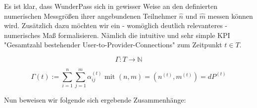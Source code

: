 \vspace{0.3cm}

Es ist klar, dass WunderPass sich in gewisser Weise an den definierten numerischen Messgrößen ihrer angebundenen Teilnehmer $\widehat{n}$ und $\widehat{m}$ messen können wird. Zusätzlich dazu möchten wir ein - womöglich deutlich relevanteres - numerisches Maß formalisieren. Nämlich die intuitive und sehr simple KPI "Gesamtzahl bestehender User-to-Provider-Connections" zum Zeitpunkt $t \in T$.

\vspace{0.3cm}

\begin{Def}\label{defGamma}

\begin{equation*}
  \Gamma : T \rightarrow \mathbb{N} 
\end{equation*}

\begin{equation*}
  \Gamma(t):= \sum_{i=1}^n \sum_{j=1}^m \alpha^{(t)}_{ij} \textrm{ mit } (n, m) = \left(n^{(t)}, m^{(t)}\right) = dP^{(t)}
\end{equation*}

\end{Def}

\vspace{0.6cm}

Nun beweisen wir folgende sich ergebende Zusammenhänge:

